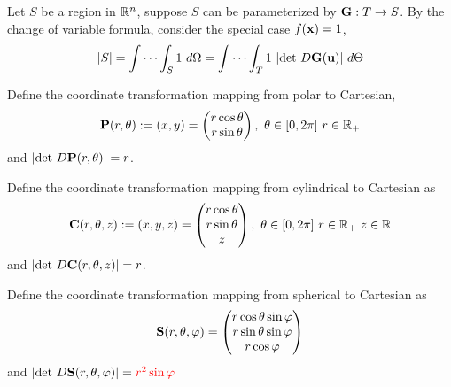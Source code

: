 \documentclass[11pt]{article}
\begin{document}
			\begin{corollary}
				Let $S$ be a region in $\mathbb{R}^n$, suppose $S$ can be parameterized by $\textbf{G}: T \to S$. By the change of variable formula, consider the special case $f(\textbf{x})=1$, 
				\begin{equation}
					|S| = \int \cdots \int_S 1\ d\Omega = \int \cdots \int_T 1\ |\text{{det }}D\textbf{G}(\textbf{u})|\ d\Theta
				\end{equation}
			\end{corollary}
			
			\begin{example}
				Define the coordinate transformation mapping from polar to Cartesian,
				\begin{equation}
					\textbf{P}(r, \theta) := (x, y) = 
					\begin{pmatrix}
						r \cos{\theta} \\
						r \sin{\theta}
					\end{pmatrix},\ \theta \in [0, 2\pi]\ r \in \mathbb{R}_{+}
				\end{equation}
				and $|\text{{det }}D\textbf{P}(r, \theta)| = r$.
			\end{example}
			
			\begin{example}
				Define the coordinate transformation mapping from cylindrical to Cartesian as
				\begin{equation}
					\ve{C}(r, \theta, z) := (x, y, z) = 
					\begin{pmatrix}
						r \cos{\theta} \\
						r \sin{\theta} \\
						z
					\end{pmatrix},\ \theta \in [0, 2\pi]\ r \in \R_{+}\ z \in \R
				\end{equation}
				and $|\text{{det }}D\textbf{C}(r, \theta, z)| = r$.
			\end{example}
			
			\begin{example}
				Define the coordinate transformation mapping from spherical to Cartesian as
				\begin{equation}
					\textbf{S}(r, \theta, \varphi) = 
					\begin{pmatrix}
						r \cos{\theta} \sin{\varphi} \\
						r \sin{\theta} \sin{\varphi} \\
						r \cos{\varphi}
					\end{pmatrix}
				\end{equation}
				and $|\text{{det }}D\textbf{S}(r, \theta, \varphi)| = \textcolor{red}{r^2 \sin{\varphi}}$
			\end{example}
	
\end{document}
